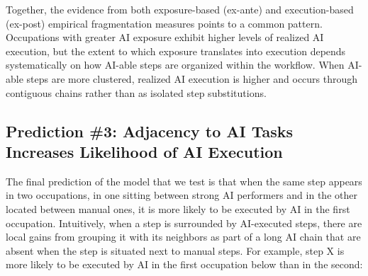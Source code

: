 Together, the evidence from both exposure-based (ex-ante) and execution-based (ex-post) empirical fragmentation measures points to a common pattern.
Occupations with greater AI exposure exhibit higher levels of realized AI execution, but the extent to which exposure translates into execution depends systematically on how AI-able steps are organized within the workflow.
When AI-able steps are more clustered, realized AI execution is higher and occurs through contiguous chains rather than as isolated step substitutions.




\subsection{Prediction \#3: Adjacency to AI Tasks Increases Likelihood of AI Execution}
\label{sec:DWA_prediction}

The final prediction of the model that we test is that when the same step appears in two occupations, in one sitting between strong AI performers and in the other located between manual ones, it is more likely to be executed by AI in the first occupation.
Intuitively, when a step is surrounded by AI-executed steps, there are local gains from grouping it with its neighbors as part of a long AI chain that are absent when the step is situated next to manual steps.
For example, step X is more likely to be executed by AI in the first occupation below than in the second: \\



